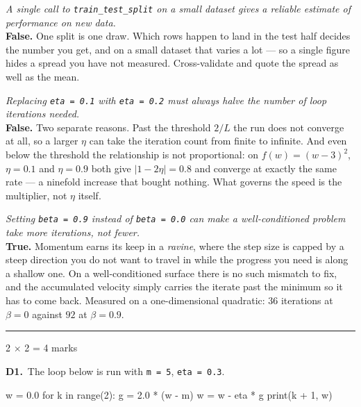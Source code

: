 \documentclass[10pt,a4paper]{article}
\newcommand{\parthead}[2]{\vspace{2pt}\noindent\rule{\linewidth}{0.4pt}\par\vspace{2pt}%
  \noindent{\bfseries Part #1}\hfill{\small #2}\par\vspace{1pt}}
\begin{document}
\begin{sC}

  \item \emph{A single call to \texttt{train\_test\_split} on a small dataset gives a reliable estimate of performance on new data.}\\[2pt] \textbf{False.} One split is one draw. Which rows happen to land in the test half decides the number you get, and on a small dataset that varies a lot --- so a single figure hides a spread you have not measured. Cross-validate and quote the spread as well as the mean.

  \item \emph{Replacing \texttt{eta = 0.1} with \texttt{eta = 0.2} must always halve the number of loop iterations needed.}\\[2pt] \textbf{False.} Two separate reasons. Past the threshold $2/L$ the run does not converge at all, so a larger $\eta$ can take the iteration count from finite to infinite. And even below the threshold the relationship is not proportional: on $f(w) = (w-3)^2$, $\eta = 0.1$ and $\eta = 0.9$ both give $\lvert 1 - 2\eta \rvert = 0.8$ and converge at exactly the same rate --- a ninefold increase that bought nothing. What governs the speed is the multiplier, not $\eta$ itself.

  \item \emph{Setting \texttt{beta = 0.9} instead of \texttt{beta = 0.0} can make a well-conditioned problem take \emph{more} iterations, not fewer.}\\[2pt] \textbf{True.} Momentum earns its keep in a \emph{ravine}, where the step size is capped by a steep direction you do not want to travel in while the progress you need is along a shallow one. On a well-conditioned surface there is no such mismatch to fix, and the accumulated velocity simply carries the iterate past the minimum so it has to come back. Measured on a one-dimensional quadratic: $36$ iterations at $\beta = 0$ against $92$ at $\beta = 0.9$.

\end{sC}

\newpage

\parthead{D --- Short answer}{2 $\times$ 2 = 4 marks}

\textbf{D1.}\ The loop below is run with \texttt{m = 5}, \texttt{eta = 0.3}.
\begin{code}
w = 0.0
for k in range(2):
    g = 2.0 * (w - m)
    w = w - eta * g
    print(k + 1, w)
\end{code}
\end{document}
